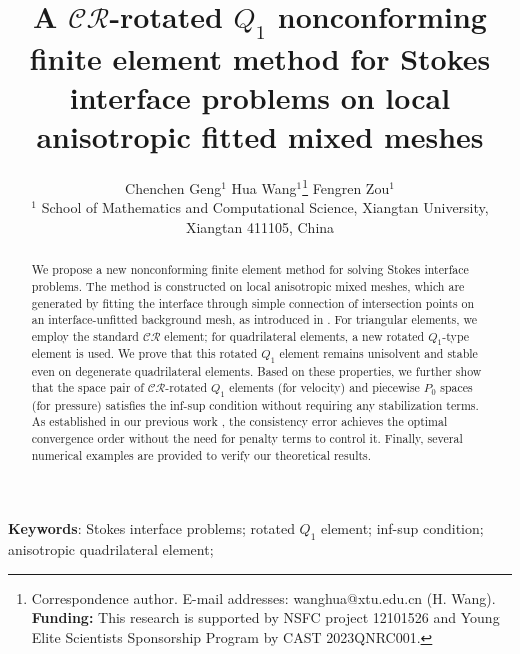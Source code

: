 \documentclass[a4paper,11pt,fleqn]{article}
\numberwithin{equation}{section}
\begin{document}
\title{A $\mathcal{CR}$-rotated $Q_1$ nonconforming finite element method for Stokes interface problems on local anisotropic fitted mixed meshes} 
\author{
	Chenchen Geng$^{1}$ \quad
	Hua Wang$^{1}$\footnote{Correspondence author. E-mail addresses: wanghua@xtu.edu.cn (H. Wang).\\
		\textbf{Funding:} This research is supported by NSFC project 12101526 and Young Elite Scientists Sponsorship Program by CAST 2023QNRC001.}
		 \quad
	Fengren Zou$^{1}$\\
	{\small $^1$ School of Mathematics and Computational Science, Xiangtan University, Xiangtan 411105, China}\\
}
	\date{}
	\maketitle
	
\begin{abstract}
	We propose a new nonconforming finite element method for solving Stokes interface problems. The method is constructed on local anisotropic mixed meshes, which are generated by fitting the interface through simple connection of intersection points on an interface-unfitted background mesh, as introduced in \cite{Hu2021optimal}. For triangular elements, we employ the standard $\mathcal{CR}$ element; for quadrilateral elements, a new rotated $Q_1$-type element is used. We prove that this rotated $Q_1$ element remains unisolvent and stable even on degenerate quadrilateral elements. Based on these properties, we further show that the space pair of $\mathcal{CR}$-rotated $Q_1$ elements (for velocity) and piecewise $P_0$ spaces (for pressure) satisfies the inf-sup condition without requiring any stabilization terms. As established in our previous work \cite{Wang2025nonconforming}, the consistency error achieves the optimal convergence order without the need for penalty terms to control it. Finally, several numerical examples are provided to verify our theoretical results.
\end{abstract}

\textbf{Keywords}: Stokes interface problems; rotated $Q_1$ element; inf-sup condition; anisotropic quadrilateral element;
	
\end{document}
